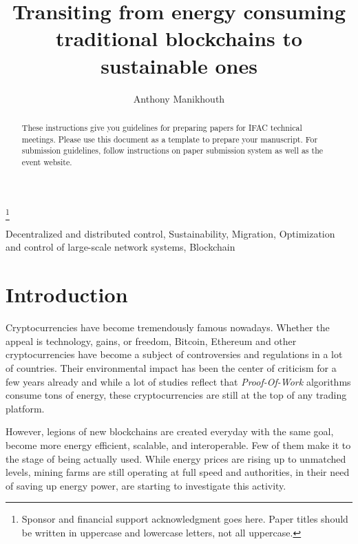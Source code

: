 \documentclass{ifacconf}
\begin{document}
\begin{frontmatter}

\title{Transiting from energy consuming traditional blockchains to sustainable ones} 

\thanks[footnoteinfo]{Sponsor and financial support acknowledgment
goes here. Paper titles should be written in uppercase and lowercase
letters, not all uppercase.}

\author[First]{Anthony Manikhouth}

\address[First]{EFREI Paris, 30 Av. de la République, 94800 Villejuif (e-mail: anthony.manikhouth@efrei.net).}

\begin{abstract}                %
These instructions give you guidelines for preparing papers for IFAC
technical meetings. Please use this document as a template to prepare
your manuscript. For submission guidelines, follow instructions on
paper submission system as well as the event website.
\end{abstract}

\begin{keyword}
Decentralized and distributed control, Sustainability, Migration, Optimization and control of large-scale network systems, Blockchain
\end{keyword}

\end{frontmatter}

\section{Introduction}
Cryptocurrencies have become tremendously famous nowadays. Whether the appeal is technology, gains, or freedom, Bitcoin, Ethereum and other cryptocurrencies have become a subject of controversies and regulations in a lot of countries. Their environmental impact has been the center of criticism for a few years already and while a lot of studies reflect that \textit{Proof-Of-Work} algorithms consume tons of energy, these cryptocurrencies are still at the top of any trading platform. 

However, legions of new blockchains are created everyday with the same goal,  become more energy efficient, scalable, and interoperable. Few of them make it to the stage of being actually used. While energy prices are rising up to unmatched levels, mining farms are still operating at full speed and authorities, in their need of saving up energy power, are starting to investigate this activity.  
\end{document}
